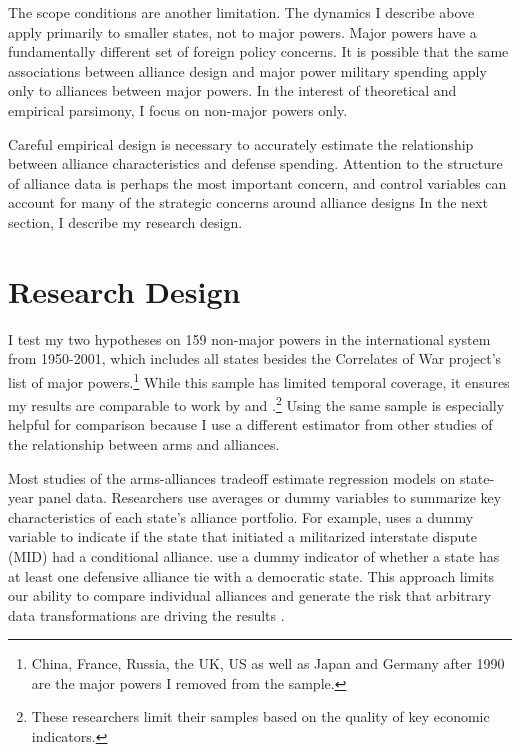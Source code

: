 \documentclass[12pt]{article}
\begin{document}
The scope conditions are another limitation. The dynamics I describe above apply primarily to smaller states, not to major powers. Major powers have a fundamentally different set of foreign policy concerns. It is possible that the same associations between alliance design and major power military spending apply only to alliances between major powers. In the interest of theoretical and empirical parsimony, I focus on non-major powers only. 

Careful empirical design is necessary to accurately estimate the relationship between alliance characteristics and defense spending. Attention to the structure of alliance data is perhaps the most important concern, and control variables can account for many of the strategic concerns around alliance designs In the next section, I describe my research design. 
 

\section*{Research Design} 

I test my two hypotheses on 159 non-major powers in the international system from 1950-2001, which includes all states besides the Correlates of War project's list of major powers.\footnote{China, France, Russia, the UK, US as well as Japan and Germany after 1990 are the major powers I removed from the sample.} While this sample has limited temporal coverage, it ensures my results are comparable to work by \citet{DigiuseppePoast2016} and \citet{Nordhausetal2012}.\footnote{These researchers limit their samples based on the quality of key economic indicators.} Using the same sample is especially helpful for comparison because I use a different estimator from other studies of the relationship between arms and alliances. 

Most studies of the arms-alliances tradeoff estimate regression models on state-year panel data. Researchers use averages or dummy variables to summarize key characteristics of each state's alliance portfolio. For example, \citet{Benson2012} uses a dummy variable to indicate if the state that initiated a militarized interstate dispute (MID) had a conditional alliance. \citet{DigiuseppePoast2016} use a dummy indicator of whether a state has at least one defensive alliance tie with a democratic state. This approach limits our ability to compare individual alliances and generate the risk that arbitrary data transformations are driving the results \citep{GelmanLoken2013}. 
\end{document}
